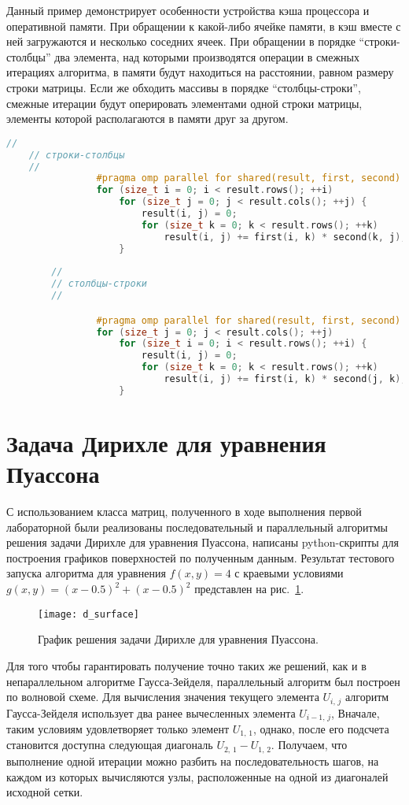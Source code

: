 \documentclass[13pt]{article}
\begin{document}
	Данный пример демонстрирует особенности устройства кэша процессора и оперативной памяти. При обращении к какой-либо ячейке памяти, в кэш вместе с ней загружаются и несколько соседних ячеек. При обращении в порядке ``строки-столбцы'' два элемента, над которыми производятся операции в смежных итерациях алгоритма, в памяти будут находиться на расстоянии, равном размеру строки матрицы. Если же обходить массивы в порядке ``столбцы-строки'', смежные итерации будут оперировать элементами одной строки матрицы, элементы которой располагаются в памяти друг за другом.
	
	\begin{lstlisting}[language=C++, caption={Два способа обхода матрицы}, label={lst:matrixLookup}, texcl=true]
	//
	// строки-столбцы
	//
				#pragma omp parallel for shared(result, first, second)
				for (size_t i = 0; i < result.rows(); ++i) 
					for (size_t j = 0; j < result.cols(); ++j) {
						result(i, j) = 0;
						for (size_t k = 0; k < result.rows(); ++k) 
							result(i, j) += first(i, k) * second(k, j);
					}
					
		//
		// столбцы-строки
		//

				#pragma omp parallel for shared(result, first, second)
				for (size_t j = 0; j < result.cols(); ++j) 
					for (size_t i = 0; i < result.rows(); ++i) {
						result(i, j) = 0;
						for (size_t k = 0; k < result.rows(); ++k) 
							result(i, j) += first(i, k) * second(j, k);
					}

	\end{lstlisting}
	\section{Задача Дирихле для уравнения Пуассона}\label{sec:lab2}

	С использованием класса матриц, полученного в ходе выполнения первой лабораторной были реализованы последовательный и параллельный алгоритмы решения задачи Дирихле для уравнения Пуассона, написаны python-скрипты для построения графиков поверхностей по полученным данным.
	Результат тестового запуска алгоритма для уравнения $f(x,y) = 4$ с краевыми условиями $g(x,y) =(x - 0.5)^2 + (x - 0.5)^2$ представлен на рис.~\ref{fig:surfPlot}.
	\begin{figure}[h]
		\centering		\texttt{[image: d\_surface]}
		\caption{График решения задачи Дирихле для уравнения Пуассона.}
		\label{fig:surfPlot} 
	\end{figure}

	Для того чтобы гарантировать получение точно таких же решений, как и в непараллельном алгоритме Гаусса-Зейделя, параллельный алгоритм был построен по волновой схеме. Для вычисления значения текущего элемента $U_{i,\,j}$ алгоритм Гаусса-Зейделя использует два ранее вычесленных элемента $U_{i-1,\,j}$, Вначале, таким условиям удовлетворяет только элемент $U_{1,\,1}$, однако, после его подсчета становится доступна следующая диагональ $U_{2,\,1} - U_{1,\,2}$. Получаем,	что выполнение одной итерации можно разбить на последовательность шагов, на каждом из которых вычисляются узлы, расположенные на одной из диагоналей исходной сетки.
\end{document}

